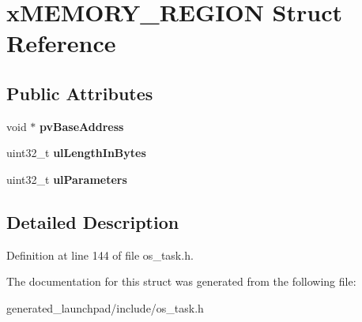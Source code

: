 \hypertarget{structxMEMORY__REGION}{}\section{x\+M\+E\+M\+O\+R\+Y\+\_\+\+R\+E\+G\+I\+ON Struct Reference}
\label{structxMEMORY__REGION}
\subsection*{Public Attributes}
\begin{DoxyCompactItemize}
\item 
\mbox{\label{structxMEMORY__REGION_a228036bbfdbc38f170e45deadb166172}} 
void $\ast$ {\bfseries pv\+Base\+Address}
\item 
\mbox{\label{structxMEMORY__REGION_a97e59578d3c4c46270d33e7206258a65}} 
uint32\+\_\+t {\bfseries ul\+Length\+In\+Bytes}
\item 
\mbox{\label{structxMEMORY__REGION_a6ba180553e9a318f23acc5f4664934e3}} 
uint32\+\_\+t {\bfseries ul\+Parameters}
\end{DoxyCompactItemize}


\subsection{Detailed Description}


Definition at line 144 of file os\+\_\+task.\+h.



The documentation for this struct was generated from the following file\+:\begin{DoxyCompactItemize}
\item 
generated\+\_\+launchpad/include/os\+\_\+task.\+h\end{DoxyCompactItemize}
